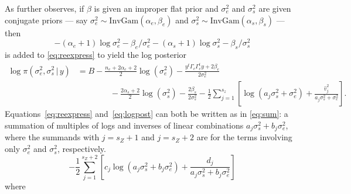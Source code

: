 \documentclass{report}
\newcommand{\IG}{\text{InvGam}}
\newcommand{\sigssq}{\sigma_s^2}
\newcommand{\sigesq}{\sigma_e^2}
\newcommand{\ass}{a_j\sigssq + \sigesq}
\newcommand{\abss}{a_j\sigssq + b_j\sigesq}
\newcommand{\g}{\,|\,}
\begin{document}
As \cite{hodges:2013} further observes, if $\beta$ is given an improper flat prior and $\sigesq$ and $\sigssq$ are given conjugate priors --- say $\sigesq \sim \IG(\alpha_e,\beta_e)$ and $\sigssq \sim \IG(\alpha_s,\beta_s)$ --- then \begin{equation*}
  -(\alpha_e+1) \log\sigesq - \beta_e/\sigesq -(\alpha_s+1) \log\sigssq - \beta_s/\sigssq
\end{equation*}
is added to \eqref{eq:reexpress} to yield
the log posterior
\begin{equation}
\label{eq:logpost}
  \begin{split}
  \log\pi(\sigesq,\sigssq\g y) &=
  B - \frac{n_e + 2\alpha_e + 2}{2}\log(\sigesq) -
    \frac{y^t \Gamma_c \Gamma^t_c y + 2\beta_e}{2\sigesq}\\
    &\qquad\qquad - \frac{2\alpha_s + 2} {2}\log(\sigssq) - \frac{2\beta_s}{2\sigssq}
    - \frac{1}{2} \sum_{j=1}^{s_z} \left[ \log(\ass) + \frac{\hat v_j^2}{\ass}\right].
  \end{split}
\end{equation}
Equations~\eqref{eq:reexpress} and~\eqref{eq:logpost} can both be written as in \eqref{eq:sum}: a summation of multiples of logs and inverses of linear combinations $\abss$, where the summands with $j=s_Z+1$ and $j=s_Z+2$ are for the terms involving only $\sigesq$ and $\sigssq$, respectively.
\begin{equation}
\label{eq:sum}
  -\frac{1}{2} \sum_{j=1}^{s_Z+2}\left[ c_j \log(\abss) + \frac{d_j}{\abss}\right]
\end{equation}
where
\end{document}
